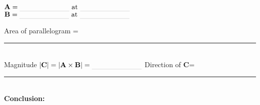 \documentclass[main.tex]{subfiles}
\begin{document}
\begin{doublespace}

\begin{centering}
$\mathbf{A}=\rule[-1mm]{2.5cm}{.1pt}\text{ at }\rule[-1mm]{2.5cm}{.1pt}$\\
$\mathbf{B}=\rule[-1mm]{2.5cm}{.1pt}\text{ at }\rule[-1mm]{2.5cm}{.1pt}$\\
\end{centering}\vspace{10pt}


Area of parallelogram = \rule[-1mm]{2.5cm}{.1pt}\\
Magnitude $|\mathbf{C}|=|\mathbf{A}\times\mathbf{B}|=\rule[-1mm]{2.5cm}{.1pt}$ \quad Direction of $\mathbf{C}$=\rule[-1mm]{2.5cm}{.1pt}\\

\newpage
\textbf{Conclusion:}

\end{doublespace}
\end{document}
